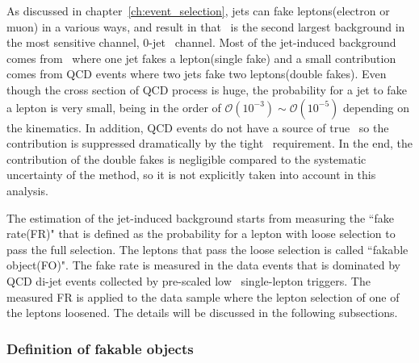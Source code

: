 As discussed in chapter~\ref{ch:event_selection}, 
jets can fake leptons(electron or muon) in a various ways, 
and result in that \Wjets\ is the second largest background in the most 
sensitive channel, 0-jet \DF\ channel. 
Most of the jet-induced background comes from \Wjets\ where one jet fakes a lepton(single fake)
and a small contribution comes from QCD events where two jets fake two leptons(double fakes).  
Even though the cross section of QCD process is huge, the probability for a jet 
to fake a lepton is very small, being in the order of 
$\mathcal{O}(10^{-3}) \sim \mathcal{O}(10^{-5})$
depending on the kinematics. In addition, QCD events do not have a source of true \met\, 
so the contribution is suppressed dramatically by the tight \met\ requirement. 
In the end, the contribution of the double fakes is negligible compared to the 
systematic uncertainty of the method, so it is not explicitly taken into account in this analysis. 

The estimation of the jet-induced background starts from measuring the ``fake rate(FR)"
that is defined as the probability for a lepton with loose selection to pass the full selection. 
The leptons that pass the loose selection is called ``fakable object(FO)". The fake rate is 
measured in the data events that is dominated by QCD di-jet events collected 
by pre-scaled low \pt\ single-lepton triggers. 
The measured FR is applied to the data sample where the lepton selection 
of one of the leptons loosened. The details will be discussed in the following subsections.

\subsubsection{Definition of fakable objects}

